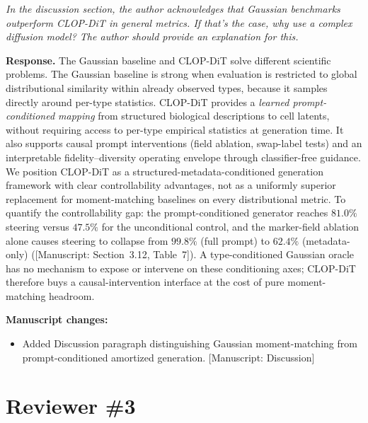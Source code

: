 \documentclass[11pt,letterpaper]{article}
\newcommand{\msref}[1]{\textcolor{blue!60!black}{\textsf{[Manuscript: #1]}}}
\begin{document}
\begin{reviewercomment}
\itshape
In the discussion section, the author acknowledges that Gaussian benchmarks outperform CLOP-DiT in general metrics. If that's the case, why use a complex diffusion model? The author should provide an explanation for this.
\end{reviewercomment}

\noindent\textbf{Response.}
The Gaussian baseline and CLOP-DiT solve different scientific problems. The Gaussian baseline is strong when evaluation is restricted to global distributional similarity within already observed types, because it samples directly around per-type statistics. CLOP-DiT provides a \emph{learned prompt-conditioned mapping} from structured biological descriptions to cell latents, without requiring access to per-type empirical statistics at generation time. It also supports causal prompt interventions (field ablation, swap-label tests) and an interpretable fidelity--diversity operating envelope through classifier-free guidance. We position CLOP-DiT as a structured-metadata-conditioned generation framework with clear controllability advantages, not as a uniformly superior replacement for moment-matching baselines on every distributional metric. To quantify the controllability gap: the prompt-conditioned generator reaches $81.0\%$ steering versus $47.5\%$ for the unconditional control, and the marker-field ablation alone causes steering to collapse from $99.8\%$ (full prompt) to $62.4\%$ (metadata-only) (\msref{Section~3.12, Table~7}). A type-conditioned Gaussian oracle has no mechanism to expose or intervene on these conditioning axes; CLOP-DiT therefore buys a causal-intervention interface at the cost of pure moment-matching headroom.

\noindent\textbf{Manuscript changes:}
\begin{itemize}
  \item Added Discussion paragraph distinguishing Gaussian moment-matching from prompt-conditioned amortized generation. \msref{Discussion}
\end{itemize}


\newpage

\section*{Reviewer \#3}
\end{document}
